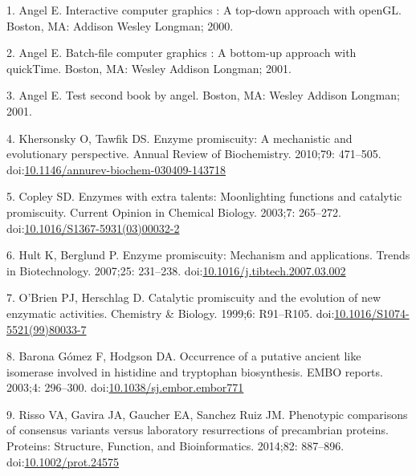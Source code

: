 \documentclass[12pt,twoside]{reedthesis}
\begin{document}
  \hypertarget{refs}{}
  \hypertarget{ref-angel2000}{}
  1. Angel E. Interactive computer graphics : A top-down approach with
  openGL. Boston, MA: Addison Wesley Longman; 2000.
  
  \hypertarget{ref-angel2001}{}
  2. Angel E. Batch-file computer graphics : A bottom-up approach with
  quickTime. Boston, MA: Wesley Addison Longman; 2001.
  
  \hypertarget{ref-angel2002a}{}
  3. Angel E. Test second book by angel. Boston, MA: Wesley Addison
  Longman; 2001.
  
  \hypertarget{ref-khersonskyux5fenzymeux5f2010}{}
  4. Khersonsky O, Tawfik DS. Enzyme promiscuity: A mechanistic and
  evolutionary perspective. Annual Review of Biochemistry. 2010;79:
  471--505.
  doi:\href{https://doi.org/10.1146/annurev-biochem-030409-143718}{10.1146/annurev-biochem-030409-143718}
  
  \hypertarget{ref-copleyux5fenzymesux5f2003}{}
  5. Copley SD. Enzymes with extra talents: Moonlighting functions and
  catalytic promiscuity. Current Opinion in Chemical Biology. 2003;7:
  265--272.
  doi:\href{https://doi.org/10.1016/S1367-5931(03)00032-2}{10.1016/S1367-5931(03)00032-2}
  
  \hypertarget{ref-hultux5fenzymeux5f2007}{}
  6. Hult K, Berglund P. Enzyme promiscuity: Mechanism and applications.
  Trends in Biotechnology. 2007;25: 231--238.
  doi:\href{https://doi.org/10.1016/j.tibtech.2007.03.002}{10.1016/j.tibtech.2007.03.002}
  
  \hypertarget{ref-obrienux5fcatalyticux5f1999}{}
  7. O'Brien PJ, Herschlag D. Catalytic promiscuity and the evolution of
  new enzymatic activities. Chemistry \& Biology. 1999;6: R91--R105.
  doi:\href{https://doi.org/10.1016/S1074-5521(99)80033-7}{10.1016/S1074-5521(99)80033-7}
  
  \hypertarget{ref-baronagomezux5foccurrenceux5f2003}{}
  8. Barona Gómez F, Hodgson DA. Occurrence of a putative ancient like
  isomerase involved in histidine and tryptophan biosynthesis. EMBO
  reports. 2003;4: 296--300.
  doi:\href{https://doi.org/10.1038/sj.embor.embor771}{10.1038/sj.embor.embor771}
  
  \hypertarget{ref-rissoux5fphenotypicux5f2014}{}
  9. Risso VA, Gavira JA, Gaucher EA, Sanchez Ruiz JM. Phenotypic
  comparisons of consensus variants versus laboratory resurrections of
  precambrian proteins. Proteins: Structure, Function, and Bioinformatics.
  2014;82: 887--896.
  doi:\href{https://doi.org/10.1002/prot.24575}{10.1002/prot.24575}
  
\end{document}
